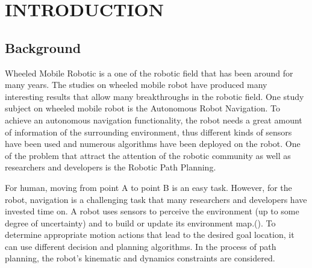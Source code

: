 \section{INTRODUCTION}
\subsection{Background}
\hspace{1.27cm}
Wheeled Mobile Robotic is a one of the robotic field that has been around for many years. The studies on wheeled mobile robot have produced many interesting results that allow many breakthroughs in the robotic field. One study subject on wheeled mobile robot is the Autonomous Robot Navigation. To achieve an autonomous navigation functionality, the robot needs a great amount of information of the surrounding environment, thus different kinds of sensors have been used and numerous algorithms have been deployed on the robot. One of the problem that attract the attention of the robotic community as well as researchers and developers is the Robotic Path Planning.\par


\hspace{1.27cm}
For human, moving from point A to point B is an easy task. However, for the robot, navigation is a challenging task that many researchers and developers have invested time on. A robot uses sensors to perceive the environment (up to some degree of uncertainty) and to build or update its environment map.(\cite{KLANCAR2017161}). To determine appropriate motion actions that lead to the desired goal location, it can use different decision and planning algorithms. In the process of path planning, the robot’s kinematic and dynamics constraints are considered.\par

